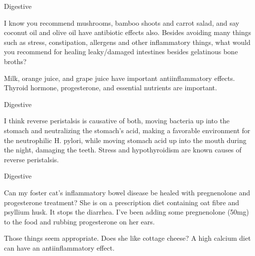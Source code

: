 \documentclass[11pt,oneside,openany,extrafontsizes]{memoir}
\begin{document}
\begin{qaexchange}{Digestive}

    \begin{question}
        I know you recommend mushrooms, bamboo shoots and carrot salad, and say coconut oil and olive oil have antibiotic effects also. Besides avoiding many things such as stress, constipation, allergens and other inflammatory things, what would you recommend for healing leaky/damaged intestines besides gelatinous bone broths?
    \end{question}

    \begin{answer}
        Milk, orange juice, and grape juice have important antiinflammatory effects. Thyroid hormone, progesterone, and essential nutrients are important.
    \end{answer}
\end{qaexchange}

\begin{standalonequote}{Digestive}

    \begin{answer}
        I think reverse peristalsis is causative of both, moving bacteria up into the stomach and neutralizing the stomach's acid, making a favorable environment for the neutrophilic H. pylori, while moving stomach acid up into the mouth during the night, damaging the teeth. Stress and hypothyroidism are known causes of reverse peristalsis.
    \end{answer}
\end{standalonequote}

\begin{qaexchange}{Digestive}

    \begin{question}
        Can my foster cat's inflammatory bowel disease be healed with pregnenolone and progesterone treatment? She is on a prescription diet containing oat fibre and psyllium husk. It stops the diarrhea. I've been adding some pregnenolone (50mg) to the food and rubbing progesterone on her ears.
    \end{question}

    \begin{answer}
        Those things seem appropriate. Does she like cottage cheese? A high calcium diet can have an antiinflammatory effect.
    \end{answer}
\end{qaexchange}
\end{document}
